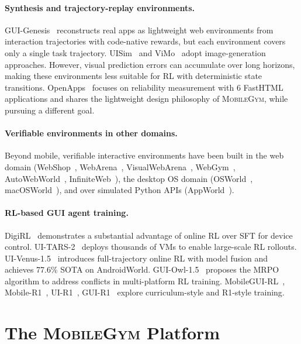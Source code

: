 \documentclass[11pt]{article}
\newcommand{\sys}{\textsc{MobileGym}}
\begin{document}
\paragraph{Synthesis and trajectory-replay environments.} GUI-Genesis~\cite{GUI-GENESIS} reconstructs real apps as lightweight web environments from interaction trajectories with code-native rewards, but each environment covers only a single task trajectory. UISim~\cite{UISim} and ViMo~\cite{ViMo} adopt image-generation approaches. However, visual prediction errors can accumulate over long horizons, making these environments less suitable for RL with deterministic state transitions. OpenApps~\cite{OpenApps} focuses on reliability measurement with 6 FastHTML applications and shares the lightweight design philosophy of \sys{}, while pursuing a different goal.

\paragraph{Verifiable environments in other domains.} Beyond mobile, verifiable interactive environments have been built in the web domain (WebShop~\cite{WebShop}, WebArena~\cite{WebArena}, VisualWebArena~\cite{VisualWebArena}, WebGym~\cite{WebGym}, AutoWebWorld~\cite{AutoWebWorld}, InfiniteWeb~\cite{InfiniteWeb}), the desktop OS domain (OSWorld~\cite{OSWorld}, macOSWorld~\cite{macOSWorld}), and over simulated Python APIs (AppWorld~\cite{AppWorld}).

\paragraph{RL-based GUI agent training.} DigiRL~\cite{DigiRL} demonstrates a substantial advantage of online RL over SFT for device control. UI-TARS-2~\cite{UITARS2} deploys thousands of VMs to enable large-scale RL rollouts. UI-Venus-1.5~\cite{UIVenus15} introduces full-trajectory online RL with model fusion and achieves 77.6\% SOTA on AndroidWorld. GUI-Owl-1.5~\cite{GUIOw15} proposes the MRPO algorithm to address conflicts in multi-platform RL training. MobileGUI-RL~\cite{MobileGUIRL}, Mobile-R1~\cite{MobileR1}, UI-R1~\cite{UIR1}, GUI-R1~\cite{GUIR1} explore curriculum-style and R1-style training.


\section{The \sys{} Platform}\label{sec:system}
\end{document}
